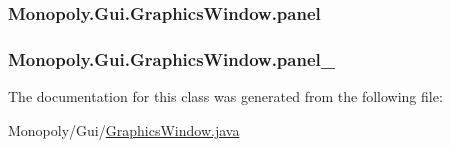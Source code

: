 \subsubsection[{\texorpdfstring{panel}{panel}}]{ Monopoly.\+Gui.\+Graphics\+Window.\+panel\hspace{0.3cm}{\ttfamily [private]}}\hypertarget{class_monopoly_1_1_gui_1_1_graphics_window_ae8c4d8f340754454eb9297e23614157f}{}\label{class_monopoly_1_1_gui_1_1_graphics_window_ae8c4d8f340754454eb9297e23614157f}
\subsubsection[{\texorpdfstring{panel\+\_\+1}{panel_1}}]{ Monopoly.\+Gui.\+Graphics\+Window.\+panel\+\_\hspace{0.3cm}{\ttfamily [private]}}\hypertarget{class_monopoly_1_1_gui_1_1_graphics_window_a402bbb6f51be8880740cbf75c9a830d5}{}\label{class_monopoly_1_1_gui_1_1_graphics_window_a402bbb6f51be8880740cbf75c9a830d5}


The documentation for this class was generated from the following file\+:\begin{DoxyCompactItemize}
\item 
Monopoly/\+Gui/\hyperlink{_graphics_window_8java}{Graphics\+Window.\+java}\end{DoxyCompactItemize}
